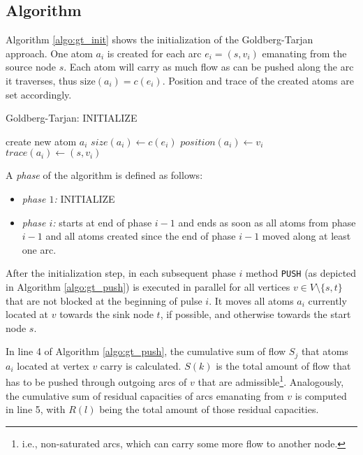 \documentclass[a4paper,10pt, twocolumn]{article}
\begin{document}
\subsection{Algorithm}
\label{sec:gt_algo}
Algorithm \ref{algo:gt_init} shows the initialization of the Goldberg-Tarjan approach. One atom $a_i$ is created for each arc $e_i=(s, v_i)$ emanating from the source node $s$. Each atom will carry as much flow as can be pushed along the arc  it traverses, thus $\mathrm{size}(a_i) = c(e_i)$. Position and trace of the created atoms are set accordingly.

\begin{algorithm}
\caption{Goldberg-Tarjan: INITIALIZE}
\label{algo:gt_init}
\begin{algorithmic}[1]
		\State create new atom $a_i$
		\State $size(a_i) \gets c(e_i)$
		\State $position(a_i) \gets v_i$
		\State $trace(a_i) \gets (s,v_i)$		
	\EndFor
	\EndFunction
\end{algorithmic}
\end{algorithm}

A \emph{phase} of the algorithm is defined as follows:
\begin{itemize}
	\item \textit{phase $1$:} INITIALIZE
	\item \textit{phase $i$:} starts at end of phase $i-1$ and ends as soon as all atoms from phase $i-1$ and all atoms created since the end of phase $i-1$ moved along at least one arc.
\end{itemize}		

After the initialization step, in each subsequent phase $i$ method \lstinline|PUSH| (as depicted in Algorithm \ref{algo:gt_push}) is executed in parallel for all vertices $v \in V \setminus \{s,t\}$ that are not blocked at the beginning of pulse $i$. It moves all atoms $a_i$ currently located at $v$ towards the sink node $t$, if possible, and otherwise towards the start node $s$.

In line 4 of Algorithm \ref{algo:gt_push}, the cumulative sum of flow $S_j$ that atoms $a_i$ located at vertex $v$ carry is calculated. $S(k)$ is the total amount of flow that has to be pushed through outgoing arcs of $v$ that are admissible\footnote{i.e., non-saturated arcs, which can carry some more flow to another node.}. Analogously, the cumulative sum of residual capacities of arcs emanating from $v$ is computed in line 5, with $R(l)$ being the total amount of those residual capacities.
\end{document}
